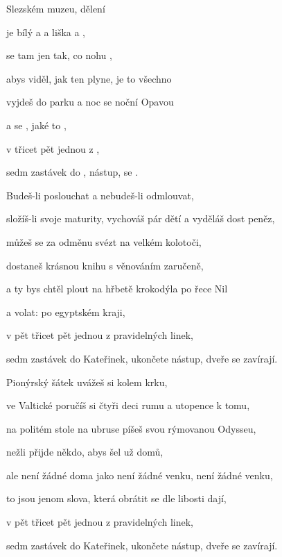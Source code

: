 

\zs
{} Slezském muzeu, dělení 

je bílý  a  a liška a  , 

 se tam jen tak, co  nohu ,

abys viděl, jak ten  plyne,  je to všechno  

 vyjdeš do parku a  noc se  noční Opavou

a  se , jaké to  ,

v  třicet pět jednou z  ,

sedm zastávek do ,  nástup,  se .
\ks

\zs
Budeš-li poslouchat a nebudeš-li odmlouvat,

složíš-li svoje maturity, vychováš pár dětí a vyděláš dost peněz,

můžeš se za odměnu svézt na velkém kolotoči,

dostaneš krásnou knihu s věnováním zaručeně,

a ty bys chtěl plout na hřbetě krokodýla po řece Nil

a volat:  po egyptském kraji,

v pět třicet pět jednou z pravidelných linek,

sedm zastávek do Kateřinek, ukončete nástup, dveře se zavírají.
\ks

\zs
Pionýrský šátek uvážeš si kolem krku,

ve Valtické poručíš si čtyři deci rumu a utopence k tomu,

na politém stole na ubruse píšeš svou rýmovanou Odysseu,

nežli přijde někdo, abys šel už domů,

ale není žádné doma jako není žádné venku, není žádné venku,

to jsou jenom slova, která obrátit se dle libosti dají,

v pět třicet pět jednou z pravidelných linek,

sedm zastávek do Kateřinek, ukončete nástup, dveře se zavírají.
\ks

